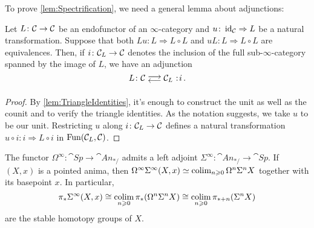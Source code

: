 To prove \cref{lem:Spectrification}, we need a general lemma about adjunctions:
\begin{lem}
	Let $L\colon \mathcal{C}\rightarrow \mathcal{C}$ be an endofunctor of an $\infty$-category and $u\colon \operatorname{id}_{\mathcal{C}}\Rightarrow L$ be a natural transformation. Suppose that both $Lu\colon L\Rightarrow L\circ L$ and $uL\colon L\Rightarrow L\circ L$ are equivalences. Then, if $i\colon \mathcal{C}_L\rightarrow\mathcal{C}$ denotes the inclusion of the full sub-$\infty$-category spanned by the image of $L$, we have an adjunction
	\begin{equation*}
		L\colon \Cc\doublelrmorphism \Cc_L\noloc i\,.
	\end{equation*}
\end{lem}
\begin{proof}
	By \cref{lem:TriangleIdentities}, it's enough to construct the unit as well as the counit and to verify the triangle identities. As the notation suggests, we take $u$ to be our unit. Restricting $u$ along $i\colon \mathcal{C}_L\rightarrow \mathcal{C}$ defines a natural transformation $u\circ i\colon i\Rightarrow L\circ i$ in $\operatorname{Fun}(\mathcal{C}_L,\mathcal{C})$. 
\end{proof}
\begin{cor}\label{cor:SigmaInfty}
	The functor $\Omega^\infty\colon \cat{Sp}\rightarrow \cat{An}_{*/}$ admits a left adjoint $\Sigma^\infty\colon \cat{An}_{*/}\rightarrow \cat{Sp}$. If $(X,x)$ is a pointed anima, then $\Omega^\infty\Sigma^\infty(X,x)\simeq \operatorname*{colim}_{n\geqslant 0}\Omega^n\Sigma^nX$ together with its basepoint $x$. In particular,
	\begin{equation*}
		\pi_*\Sigma^\infty(X,x)\cong \operatorname*{colim}_{n\geqslant 0}\pi_{*}(\Omega^n\Sigma^nX)\cong \operatorname*{colim}_{n\geqslant 0}\pi_{*+n}(\Sigma^n X)
	\end{equation*}
	are the stable homotopy groups of $X$.
\end{cor}